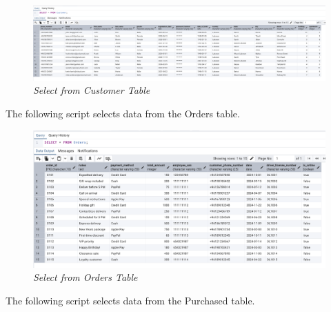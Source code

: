 \begin{figure}[H]
  \centering
  \includegraphics[width=1\textwidth]{images/sql/select/customer.png}
  \caption{\textit{Select from Customer Table}}
\end{figure}

The following script selects data from the Orders table.


\begin{figure}[H]
  \centering
  \includegraphics[width=1\textwidth]{images/sql/select/orders.png}
  \caption{\textit{Select from Orders Table}}
\end{figure}

The following script selects data from the Purchased table.


